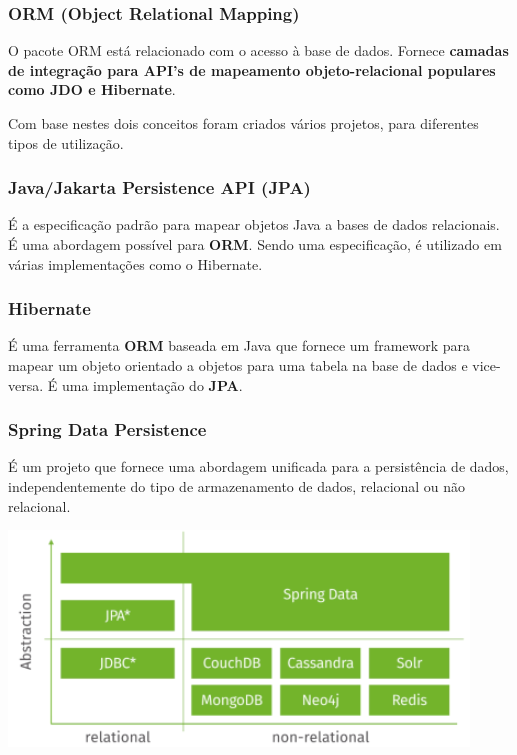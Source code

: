 \documentclass{article}
\begin{document}
\subsubsection{ORM (Object Relational Mapping)}

O pacote ORM está relacionado com o acesso à base de dados. Fornece
\textbf{camadas de integração para API's de mapeamento objeto-relacional populares
como JDO e Hibernate}.

Com base nestes dois conceitos foram criados vários projetos, para diferentes tipos de
utilização.

\subsubsection*{Java/Jakarta Persistence API (JPA)}

É a especificação padrão para mapear objetos Java a bases de dados
relacionais. É uma abordagem possível para \textbf{ORM}.
Sendo uma especificação, é utilizado em várias implementações como
o Hibernate.

\subsubsection*{Hibernate}

É uma ferramenta \textbf{ORM} baseada em Java que fornece um framework
para mapear um objeto orientado a objetos para uma tabela na base de dados
e vice-versa. É uma implementação do \textbf{JPA}.

\subsubsection*{Spring Data Persistence}

É um projeto que fornece uma abordagem unificada para a persistência
de dados, independentemente do tipo de armazenamento de dados,
relacional ou não relacional.

\begin{center}
  \includegraphics[scale=0.5]{101}
\end{center}
\end{document}
